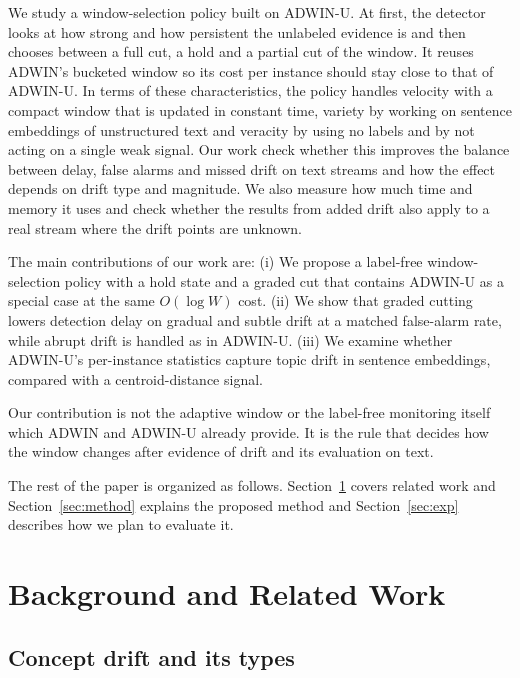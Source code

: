 \documentclass[conference]{IEEEtran}
\begin{document}
We study a window-selection policy built on ADWIN-U. At first, the detector looks at how strong and how persistent the unlabeled evidence is and then chooses between a full cut, a hold and a partial cut of the window. It reuses ADWIN's bucketed window so its cost per instance should stay close to that of ADWIN-U. In terms of these characteristics, the policy handles velocity with a compact window that is updated in constant time, variety by working on sentence embeddings of unstructured text and veracity by using no labels and by not acting on a single weak signal. Our work check whether this improves the balance between delay, false alarms and missed drift on text streams and how the effect depends on drift type and magnitude. We also measure how much time and memory it uses and check whether the results from added drift also apply to a real stream where the drift points are unknown.

The main contributions of our work are:
(i) We propose a label-free window-selection policy with a hold state and a graded cut that contains ADWIN-U as a special case at the same $O(\log W)$ cost.
(ii) We show that graded cutting lowers detection delay on gradual and subtle drift at a matched false-alarm rate, while abrupt drift is handled as in ADWIN-U.
(iii) We examine whether ADWIN-U's per-instance statistics capture topic drift in sentence embeddings, compared with a centroid-distance signal.


Our contribution is not the adaptive window or the label-free monitoring itself which ADWIN and ADWIN-U already provide. It is the rule that decides how the window changes after evidence of drift and its evaluation on text.

The rest of the paper is organized as follows. Section~\ref{sec:related} covers related work and Section~\ref{sec:method} explains the proposed method and Section~\ref{sec:exp} describes how we plan to evaluate it.

\section{Background and Related Work}
\label{sec:related}

\subsection{Concept drift and its types}
\end{document}

